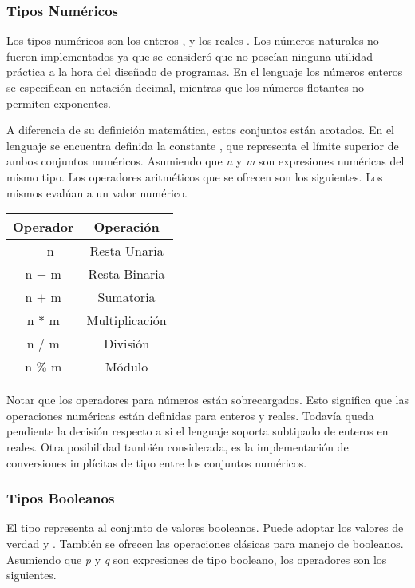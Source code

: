 \documentclass{article}
\begin{document}
\subsubsection{Tipos Numéricos}

Los tipos numéricos son los enteros , y los reales .
Los números naturales no fueron implementados ya que se consideró que no poseían ninguna utilidad práctica a la hora del diseñado de programas.
En el lenguaje los números enteros se especifican en notación decimal, mientras que los números flotantes no permiten exponentes.

A diferencia de su definición matemática, estos conjuntos están acotados.
En el lenguaje se encuentra definida la constante , que representa el límite superior de ambos conjuntos numéricos.
Asumiendo que \textit{n} y \textit{m} son expresiones numéricas del mismo tipo.
Los operadores aritméticos que se ofrecen son los siguientes.
Los mismos evalúan a un valor numérico.

\begin{center}
\begin{tabular}{| c | c |}
\hline
    Operador & Operación\\
    \hline
    $-$ n     & Resta Unaria \\
    n $-$ m   & Resta Binaria \\
    n $+$ m   & Sumatoria \\
    n $*$ m   & Multiplicación\\
    n $/$ m   & División \\
    n $\%$ m  & Módulo \\
\hline
\end{tabular}
\end{center}

Notar que los operadores para números están sobrecargados.
Esto significa que las operaciones numéricas están definidas para enteros y reales.
Todavía queda pendiente la decisión respecto a si el lenguaje soporta subtipado de enteros en reales.
Otra posibilidad también considerada, es la implementación de conversiones implícitas de tipo entre los conjuntos numéricos.

\subsubsection{Tipos Booleanos}

El tipo  representa al conjunto de valores booleanos.
Puede adoptar los valores de verdad  y .
También se ofrecen las operaciones clásicas para manejo de booleanos.
Asumiendo que \textit{p} y \textit{q} son expresiones de tipo booleano, los operadores son los siguientes.
\end{document}
